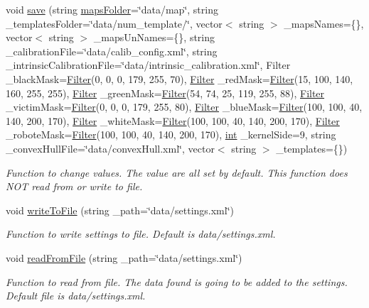 \begin{DoxyCompactItemize}
void \mbox{\hyperlink{class_settings_a6e40d9eca9f6794dee65e519ea73bb24}{save}} (string \mbox{\hyperlink{class_settings_aeddfd4457036a14cb0a48d50d9e6ccfe}{maps\+Folder}}=\char`\"{}data/map\char`\"{}, string \+\_\+templates\+Folder=\char`\"{}data/num\+\_\+template/\char`\"{}, vector$<$ string $>$ \+\_\+maps\+Names=\{\}, vector$<$ string $>$ \+\_\+maps\+Un\+Names=\{\}, string \+\_\+calibration\+File=\char`\"{}data/calib\+\_\+config.\+xml\char`\"{}, string \+\_\+intrinsic\+Calibration\+File=\char`\"{}data/intrinsic\+\_\+calibration.\+xml\char`\"{}, Filter \+\_\+black\+Mask=\mbox{\hyperlink{class_filter}{Filter}}(0, 0, 0, 179, 255, 70), \mbox{\hyperlink{class_filter}{Filter}} \+\_\+red\+Mask=\mbox{\hyperlink{class_filter}{Filter}}(15, 100, 140, 160, 255, 255), \mbox{\hyperlink{class_filter}{Filter}} \+\_\+green\+Mask=\mbox{\hyperlink{class_filter}{Filter}}(54, 74, 25, 119, 255, 88), \mbox{\hyperlink{class_filter}{Filter}} \+\_\+victim\+Mask=\mbox{\hyperlink{class_filter}{Filter}}(0, 0, 0, 179, 255, 80), \mbox{\hyperlink{class_filter}{Filter}} \+\_\+blue\+Mask=\mbox{\hyperlink{class_filter}{Filter}}(100, 100, 40, 140, 200, 170), \mbox{\hyperlink{class_filter}{Filter}} \+\_\+white\+Mask=\mbox{\hyperlink{class_filter}{Filter}}(100, 100, 40, 140, 200, 170), \mbox{\hyperlink{class_filter}{Filter}} \+\_\+robote\+Mask=\mbox{\hyperlink{class_filter}{Filter}}(100, 100, 40, 140, 200, 170), \mbox{\hyperlink{draw_8hh_aa620a13339ac3a1177c86edc549fda9b}{int}} \+\_\+kernel\+Side=9, string \+\_\+convex\+Hull\+File=\char`\"{}data/convex\+Hull.\+xml\char`\"{}, vector$<$ string $>$ \+\_\+templates=\{\})
\begin{DoxyCompactList}\small\item\em Function to change values. The value are all set by default. This function does N\+OT read from or write to file. \end{DoxyCompactList}\item 
void \mbox{\hyperlink{class_settings_a1afc50e91691fae24114ba5e248dfd87}{write\+To\+File}} (string \+\_\+path=\char`\"{}data/settings.\+xml\char`\"{})
\begin{DoxyCompactList}\small\item\em Function to write settings to file. Default is data/settings.\+xml. \end{DoxyCompactList}\item 
void \mbox{\hyperlink{class_settings_a016ac9600bf42a2814847f14e5a3d58f}{read\+From\+File}} (string \+\_\+path=\char`\"{}data/settings.\+xml\char`\"{})
\begin{DoxyCompactList}\small\item\em Function to read from file. The data found is going to be added to the settings. Default file is data/settings.\+xml. \end{DoxyCompactList}\item 

\end{DoxyCompactItemize}
